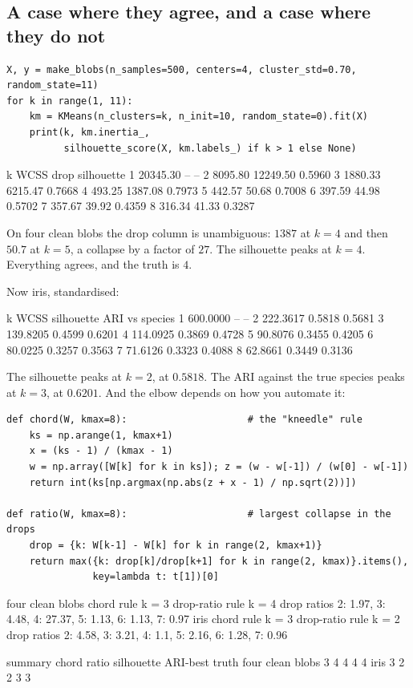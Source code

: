 \documentclass[11pt]{article}
\begin{document}
\subsection{A case where they agree, and a case where they do not}

\begin{lstlisting}
X, y = make_blobs(n_samples=500, centers=4, cluster_std=0.70, random_state=11)
for k in range(1, 11):
    km = KMeans(n_clusters=k, n_init=10, random_state=0).fit(X)
    print(k, km.inertia_,
          silhouette_score(X, km.labels_) if k > 1 else None)
\end{lstlisting}
\begin{codeout}
   k      WCSS     drop   silhouette
   1   20345.30       --   --
   2    8095.80 12249.50   0.5960
   3    1880.33  6215.47   0.7668
   4     493.25  1387.08   0.7973
   5     442.57    50.68   0.7008
   6     397.59    44.98   0.5702
   7     357.67    39.92   0.4359
   8     316.34    41.33   0.3287
\end{codeout}

On four clean blobs the drop column is unambiguous: $1387$ at $k=4$ and then
$50.7$ at $k=5$, a collapse by a factor of $27$. The silhouette peaks at
$k=4$. Everything agrees, and the truth is $4$.

Now iris, standardised:

\begin{codeout}
   k      WCSS   silhouette      ARI vs species
   1   600.0000   --       --
   2   222.3617   0.5818   0.5681
   3   139.8205   0.4599   0.6201
   4   114.0925   0.3869   0.4728
   5    90.8076   0.3455   0.4205
   6    80.0225   0.3257   0.3563
   7    71.6126   0.3323   0.4088
   8    62.8661   0.3449   0.3136
\end{codeout}

The silhouette peaks at $k = 2$, at $0.5818$. The ARI against the true
species peaks at $k = 3$, at $0.6201$. And the elbow depends on how you
automate it:

\begin{lstlisting}
def chord(W, kmax=8):                     # the "kneedle" rule
    ks = np.arange(1, kmax+1)
    x = (ks - 1) / (kmax - 1)
    w = np.array([W[k] for k in ks]); z = (w - w[-1]) / (w[0] - w[-1])
    return int(ks[np.argmax(np.abs(z + x - 1) / np.sqrt(2))])

def ratio(W, kmax=8):                     # largest collapse in the drops
    drop = {k: W[k-1] - W[k] for k in range(2, kmax+1)}
    return max({k: drop[k]/drop[k+1] for k in range(2, kmax)}.items(),
               key=lambda t: t[1])[0]
\end{lstlisting}
\begin{codeout}
  four clean blobs   chord rule k = 3   drop-ratio rule k = 4
      drop ratios       {2: 1.97, 3: 4.48, 4: 27.37, 5: 1.13, 6: 1.13, 7: 0.97}
  iris               chord rule k = 3   drop-ratio rule k = 2
      drop ratios       {2: 4.58, 3: 3.21, 4: 1.1, 5: 2.16, 6: 1.28, 7: 0.96}

  summary            chord  ratio  silhouette  ARI-best  truth
  four clean blobs       3      4           4         4      4
  iris                   3      2           2         3      3
\end{codeout}
\end{document}
